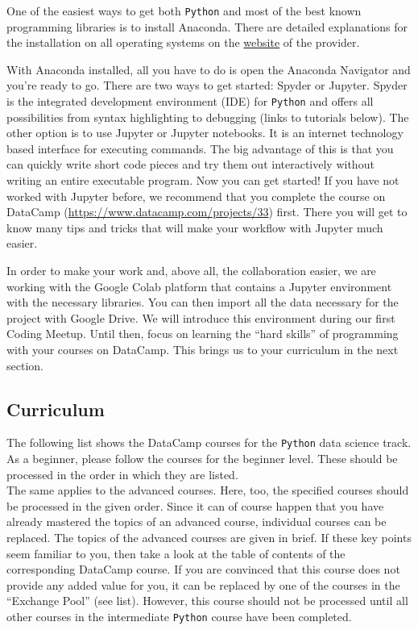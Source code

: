 \documentclass[
  11pt,
]{book}
\begin{document}
One of the easiest ways to get both \texttt{Python} and most of the best known programming libraries is to install Anaconda. There are detailed explanations for the installation on all operating systems on the \href{https://docs.anaconda.com/anaconda/install/}{website} of the provider.

With Anaconda installed, all you have to do is open the Anaconda Navigator and you're ready to go. There are two ways to get started: Spyder or Jupyter. Spyder is the integrated development environment (IDE) for \texttt{Python} and offers all possibilities from syntax highlighting to debugging (links to tutorials below). The other option is to use Jupyter or Jupyter notebooks. It is an internet technology based interface for executing commands. The big advantage of this is that you can quickly write short code pieces and try them out interactively without writing an entire executable program.
Now you can get started! If you have not worked with Jupyter before, we recommend that you complete the course on DataCamp (\url{https://www.datacamp.com/projects/33}) first. There you will get to know many tips and tricks that will make your workflow with Jupyter much easier.

In order to make your work and, above all, the collaboration easier, we are working with the Google Colab platform that contains a Jupyter environment with the necessary libraries. You can then import all the data necessary for the project with Google Drive. We will introduce this environment during our first Coding Meetup. Until then, focus on learning the ``hard skills'' of programming with your courses on DataCamp. This brings us to your curriculum in the next section.

\hypertarget{curriculum-1}{%
\subsection{Curriculum}\label{curriculum-1}}

The following list shows the DataCamp courses for the \texttt{Python} data science track. As a beginner, please follow the courses for the beginner level. These should be processed in the order in which they are listed.\\
The same applies to the advanced courses. Here, too, the specified courses should be processed in the given order. Since it can of course happen that you have already mastered the topics of an advanced course, individual courses can be replaced. The topics of the advanced courses are given in brief. If these key points seem familiar to you, then take a look at the table of contents of the corresponding DataCamp course.
If you are convinced that this course does not provide any added value for you, it can be replaced by one of the courses in the ``Exchange Pool'' (see list). However, this course should not be processed until all other courses in the intermediate \texttt{Python} course have been completed.
\end{document}

